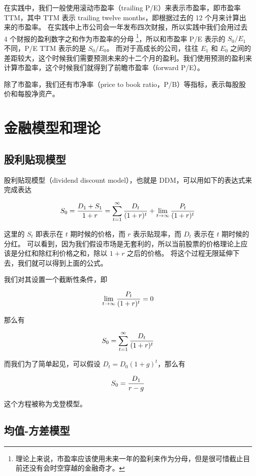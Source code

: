 \documentclass[utf8,a4paper,nofonts,9pt]{ctexbook}
\begin{document}
在实践中，我们一般使用滚动市盈率（trailing P/E）来表示市盈率，即市盈率 TTM，其中 TTM 表示 trailing twelve months，即根据过去的 12 个月来计算出来的市盈率。
在实践中上市公司会一年发布四次财报，所以实践中我们会用过去 4 个财报的盈利数字之和作为市盈率的分母
\footnote{理论上来说，市盈率应该使用未来一年的盈利来作为分母，但是很可惜截止目前还没有会时空穿越的金融奇才。}，所以和市盈率 P/E 表示的 $S_0 / E_1$ 不同，P/E TTM 表示的是 $S_0 / E_0$。
而对于高成长的公司，往往 $E_1$ 和 $E_0$ 之间的差距较大，这个时候我们需要预测未来的十二个月的盈利。我们使用预测的盈利来计算市盈率，这个时候我们就得到了前瞻市盈率（forward P/E）。

除了市盈率，我们还有市净率（price to book ratio，P/B）等指标，表示每股股价和每股净资产。

\section{金融模型和理论}

\subsection{股利贴现模型}
\label{title:DDM}

股利贴现模型（dividend discount model），也就是 DDM，可以用如下的表达式来完成表达

$$
S_0 = {D_1 + S_1 \over 1 + r} = \sum_{t=1}^{\infty} {D_t \over (1 + r)^t} + \lim_{t \to \infty} {P_t \over (1 + r)^t}
$$

这里的 $S_t$ 即表示在 $t$ 期时候的价格，而 $r$ 表示贴现率，而 $D_t$ 表示在 $t$ 期时候的分红。
可以看到，因为我们假设市场是无套利的，所以当前股票的价格理论上应该是分红和除红利价格之和，除以 $1 + r$ 之后的价格。
将这个过程无限延伸下去，我们就可以得到上面的公式。

我们对其设置一个截断性条件，即

$$
\lim_{t \to \infty} {P_t \over (1 + r)^t} = 0
$$

那么有

$$
S_0 = \sum_{t=1}^{\infty} {D_t \over (1 + r)^t}
$$

而我们为了简单起见，可以假设 $D_t = D_0 (1 + g)^t$，那么有

$$
S_0 = {D_1 \over r - g}
$$

这个方程被称为戈登模型。

\subsection{均值-方差模型}
\label{title:E-sigma-model}
\end{document}

